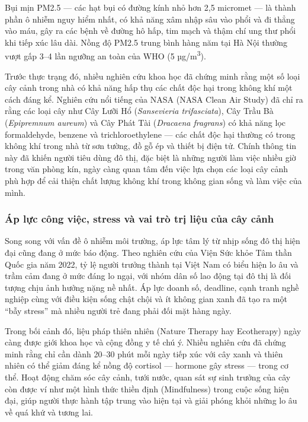\documentclass[11pt, a4paper]{article}
\begin{document}
Bụi mịn PM2.5 --- các hạt bụi có đường kính nhỏ hơn 2,5 micromet --- là thành phần ô nhiễm nguy hiểm nhất, có khả năng xâm nhập sâu vào phổi và đi thẳng vào máu, gây ra các bệnh về đường hô hấp, tim mạch và thậm chí ung thư phổi khi tiếp xúc lâu dài. Nồng độ PM2.5 trung bình hàng năm tại Hà Nội thường vượt gấp 3--4 lần ngưỡng an toàn của WHO (5 µg/m\textsuperscript{3}).

Trước thực trạng đó, nhiều nghiên cứu khoa học đã chứng minh rằng một số loại cây cảnh trong nhà có khả năng hấp thụ các chất độc hại trong không khí một cách đáng kể. Nghiên cứu nổi tiếng của NASA (NASA Clean Air Study) đã chỉ ra rằng các loại cây như Cây Lưỡi Hổ (\textit{Sansevieria trifasciata}), Cây Trầu Bà (\textit{Epipremnum aureum}) và Cây Phát Tài (\textit{Dracaena fragrans}) có khả năng lọc formaldehyde, benzene và trichloroethylene --- các chất độc hại thường có trong không khí trong nhà từ sơn tường, đồ gỗ ép và thiết bị điện tử. Chính thông tin này đã khiến người tiêu dùng đô thị, đặc biệt là những người làm việc nhiều giờ trong văn phòng kín, ngày càng quan tâm đến việc lựa chọn các loại cây cảnh phù hợp để cải thiện chất lượng không khí trong không gian sống và làm việc của mình.

\subsubsection{Áp lực công việc, stress và vai trò trị liệu của cây cảnh}

Song song với vấn đề ô nhiễm môi trường, áp lực tâm lý từ nhịp sống đô thị hiện đại cũng đang ở mức báo động. Theo nghiên cứu của Viện Sức khỏe Tâm thần Quốc gia năm 2022, tỷ lệ người trưởng thành tại Việt Nam có biểu hiện lo âu và trầm cảm đang ở mức đáng lo ngại, với nhóm dân số lao động tại đô thị là đối tượng chịu ảnh hưởng nặng nề nhất. Áp lực doanh số, deadline, cạnh tranh nghề nghiệp cùng với điều kiện sống chật chội và ít không gian xanh đã tạo ra một ``bẫy stress'' mà nhiều người trẻ đang phải đối mặt hàng ngày.

Trong bối cảnh đó, liệu pháp thiên nhiên (Nature Therapy hay Ecotherapy) ngày càng được giới khoa học và cộng đồng y tế chú ý. Nhiều nghiên cứu đã chứng minh rằng chỉ cần dành 20--30 phút mỗi ngày tiếp xúc với cây xanh và thiên nhiên có thể giảm đáng kể nồng độ cortisol --- hormone gây stress --- trong cơ thể. Hoạt động chăm sóc cây cảnh, tưới nước, quan sát sự sinh trưởng của cây còn được ví như một hình thức thiền định (Mindfulness) trong cuộc sống hiện đại, giúp người thực hành tập trung vào hiện tại và giải phóng khỏi những lo âu về quá khứ và tương lai.
\end{document}
